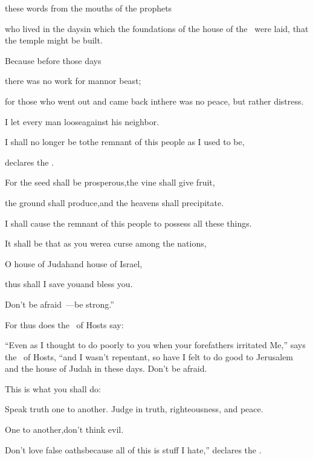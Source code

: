 \begin{inparaenum}
  \pb{}these words from the mouths of the prophets%

  \pb{}who lived in the days\pa{}in which the foundations of the house of the \lord\ were laid, that the temple might be built.%

  \pb{} Because before those days%

  \pb{}there was no work for man\pa{}nor beast;%

  \pb{}for those who went out and came back in\pa{}there was no peace, but rather distress.%

  \pb{}I let every man loose\pa{}against his neighbor.%

  \pb{} I shall no longer be to\pa{}the remnant of this people as I used to be,%

  \pb{}declares the \lord.%

  \pb{} For the seed shall be prosperous,\pa{}the vine shall give fruit,%

  \pb{}the ground shall produce,\pa{}and the heavens shall precipitate.%

  \pb{}I shall cause the remnant of this people to possess all these things.%

  \pb{} It shall be that as you were\pa{}a curse among the nations,%

  \pb{}O house of Judah\pa{}and house of Israel,%

  \pb{}thus shall I save you\pa{}and bless you.%

  \pb{}Don't be afraid~---\pa{}be strong.''%

  \pa{} For thus does the \lord\ of Hosts say:%

  \pb{}``Even as I thought to do poorly to you when your forefathers irritated Me,'' says the \lord\ of Hosts, ``and I wasn't repentant,  so have I felt to do good to Jerusalem and the house of Judah in these days. Don't be afraid.%

  \pa{} This is what you shall do:%

  \pb{}Speak truth one to another. Judge in truth, righteousness, and peace.%

  \pb{} One to another,\pa{}don't think evil.%

  \pb{}Don't love false oaths\pa{}because all of this is stuff I hate,'' declares the \lord.%
\end{inparaenum}
